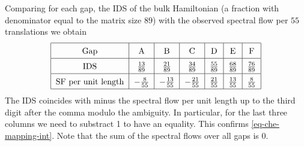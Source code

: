 \documentclass[11pt]{amsart}
\begin{document}
Comparing
for each gap, the IDS of the bulk Hamiltonian (a fraction with denominator equal to the matrix size $89$) with the observed spectral flow per $55$ translations we obtain
\begin{equation}
	\centering
	\renewcommand{\arraystretch}{1.5}
	\begin{tabular}{|c|c|c|c|c|c|c|}
		\hline
		Gap & A &  B &  C &D & E & F\\
		\hline
		IDS & $\frac{13}{89}$ &  $\frac{21}{89}$ &  $\frac{34}{89}$ &$\frac{55}{89}$ &  $\frac{68}{89}$ &  $\frac{76}{89}$ \\
		\hline
		SF per unit length & $-\frac{8}{55}$ &  $-\frac{13}{55}$ &  $-\frac{21}{55}$ &$\frac{21}{55}$ &  $\frac{13}{55}$ &  $\frac{8}{55}$\\
		\hline
	\end{tabular}
\end{equation}	
The IDS coincides with minus the spectral flow per unit length 	
up to the third digit after the comma modulo the ambiguity.
In particular, for the last three columns we need to substract 1 to have an equality. This confirms \eqref{eq-che-mapping-int}. Note that the sum of the spectral flows over all gaps is $0$.

\bigskip
\end{document}
